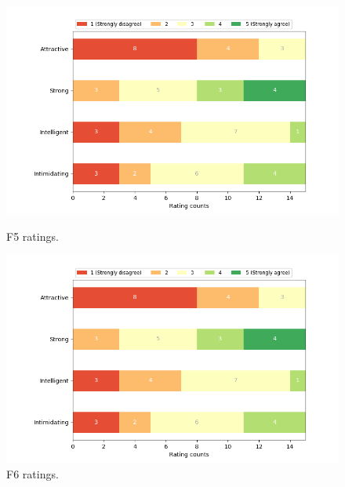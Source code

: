 \begin{figure}[H]
  \includegraphics[width=\linewidth]{Survey/FRatings/avatar_f6.png}
  \caption{F5 ratings.}
\endminipage\hfill
{}
  \includegraphics[width=\linewidth]{Survey/FRatings/avatar_f6.png}
  \caption{F6 ratings.}
\endminipage\hfill
\end{figure}
